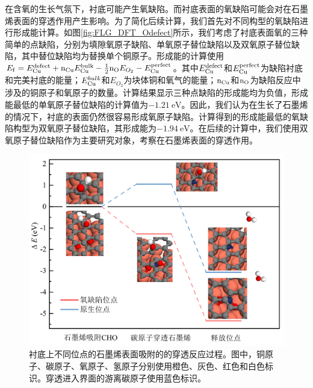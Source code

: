 在含氧的生长气氛下，衬底可能产生氧缺陷。而衬底表面的氧缺陷可能会对在石墨烯表面的穿透作用产生影响。为了简化后续计算，我们首先对不同构型的氧缺陷进行形成能计算。如图\ref{fig:FLG_DFT_Odefect}所示，我们考虑了衬底表面氧的三种简单的点缺陷，分别为\chinesecolon 填隙氧原子缺陷、单氧原子替位缺陷以及双氧原子替位缺陷，其中替位缺陷均为替换单个铜原子。形成能的计算使用$E_{\rm f}=E_{\rm Cu}^{\rm defect}+{\rm n_{Cu}}E_{\rm Cu}^{\rm bulk}-\frac{1}{2}{\rm n_{O}}E_{O_{2}} - E_{\rm Cu}^{\rm perfect}$。其中$E_{\rm Cu}^{\rm defect}$和$E_{\rm Cu}^{\rm perfect}$为缺陷衬底和完美衬底的能量；$E_{\rm Cu}^{bulk}$和$E_{O_{2}}$为块体铜和氧气的能量；${\rm n_{Cu}}$和${\rm n_{O}}$为缺陷反应中涉及的铜原子和氧原子的数量。计算结果显示三种点缺陷的形成能均为负值，形成能最低的单氧原子替位缺陷的计算值为$\SI{-1.21}{\electronvolt}$。因此，我们认为在生长了石墨烯的情况下，衬底的表面仍然很容易形成氧原子缺陷。计算得到的形成能最低的氧缺陷构型为双氧原子替位缺陷，其形成能为$\SI{-1.94}{\electronvolt}$。在后续的计算中，我们使用双氧原子替位缺陷作为主要研究对象，考察在石墨烯表面的穿透作用。

\begin{figure}[htb]
    \includegraphics{pic/FLG_DFT_CHOpene.png}
    \caption{衬底上不同位点的石墨烯表面吸附的的穿透反应过程。图中，铜原子、碳原子、氧原子、氢原子分别使用橙色、灰色、红色和白色标识。穿透进入界面的游离碳原子使用蓝色标识。}
    \label{fig:FLG_DFT_CHOpene}
\end{figure}

